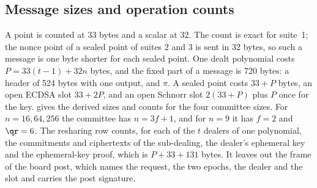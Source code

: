 \subsection{Message sizes and operation counts}

A point is counted at 33 bytes and a scalar at 32. The count is exact for suite~1; the nonce point of a sealed point of suites 2 and 3 is sent in 32 bytes, so such a message is one byte shorter for each sealed point. One dealt polynomial costs $P = 33(t-1) + 32n$ bytes, and the fixed part of a message is 720 bytes: a header of 524 bytes with one output, and $\pi$. A sealed point costs $33 + P$ bytes, an open ECDSA slot $33 + 2P$, and an open Schnorr slot $2(33 + P)$ plus $P$ once for the key.  gives the derived sizes and counts for the four committee sizes. For $n = 16, 64, 256$ the committee has $n = 3f+1$, and for $n = 9$ it has $f = 2$ and $\qr = 6$. The resharing row counts, for each of the $t$ dealers of one polynomial, the commitments and ciphertexts of the sub-dealing, the dealer's ephemeral key and the ephemeral-key proof, which is $P + 33 + 131$ bytes. It leaves out the frame of the board post, which names the request, the two epochs, the dealer and the slot and carries the post signature.

